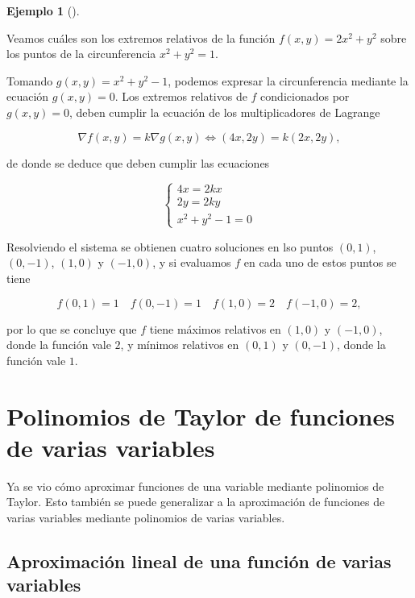 \documentclass[
  a4paper,
]{scrreport}
\theoremstyle{definition}
\theoremstyle{plain}
\theoremstyle{plain}
\theoremstyle{definition}
\theoremstyle{definition}
\newtheorem{example}{Ejemplo}[chapter]
\theoremstyle{plain}
\theoremstyle{remark}
\begin{document}
\begin{example}[]\protect\hypertarget{exm-multiplicadores-lagrange}{}\label{exm-multiplicadores-lagrange}

Veamos cuáles son los extremos relativos de la función
\(f(x,y)=2x^2+y^2\) sobre los puntos de la circunferencia \(x^2+y^2=1\).

Tomando \(g(x,y)=x^2+y^2-1\), podemos expresar la circunferencia
mediante la ecuación \(g(x,y)=0\). Los extremos relativos de \(f\)
condicionados por \(g(x,y)=0\), deben cumplir la ecuación de los
multiplicadores de Lagrange

\[
\nabla f(x,y) = k \nabla g(x,y) 
\Leftrightarrow (4x, 2y) = k (2x, 2y),
\]

de donde se deduce que deben cumplir las ecuaciones

\[
\begin{cases}
4x = 2kx\\
2y = 2ky\\
x^2+y^2-1=0
\end{cases}
\]

Resolviendo el sistema se obtienen cuatro soluciones en lso puntos
\((0,1)\), \((0,-1)\), \((1,0)\) y \((-1,0)\), y si evaluamos \(f\) en
cada uno de estos puntos se tiene

\[
f(0,1) = 1 \quad f(0,-1) = 1 \quad f(1,0)=2 \quad f(-1,0)=2,
\]

por lo que se concluye que \(f\) tiene máximos relativos en \((1,0)\) y
\((-1,0)\), donde la función vale \(2\), y mínimos relativos en
\((0,1)\) y \((0,-1)\), donde la función vale \(1\).

\end{example}

\hypertarget{polinomios-de-taylor-de-funciones-de-varias-variables}{%
\section{Polinomios de Taylor de funciones de varias
variables}\label{polinomios-de-taylor-de-funciones-de-varias-variables}}

Ya se vio cómo aproximar funciones de una variable mediante polinomios
de Taylor. Esto también se puede generalizar a la aproximación de
funciones de varias variables mediante polinomios de varias variables.

\hypertarget{aproximaciuxf3n-lineal-de-una-funciuxf3n-de-varias-variables}{%
\subsection{Aproximación lineal de una función de varias
variables}\label{aproximaciuxf3n-lineal-de-una-funciuxf3n-de-varias-variables}}
\end{document}
